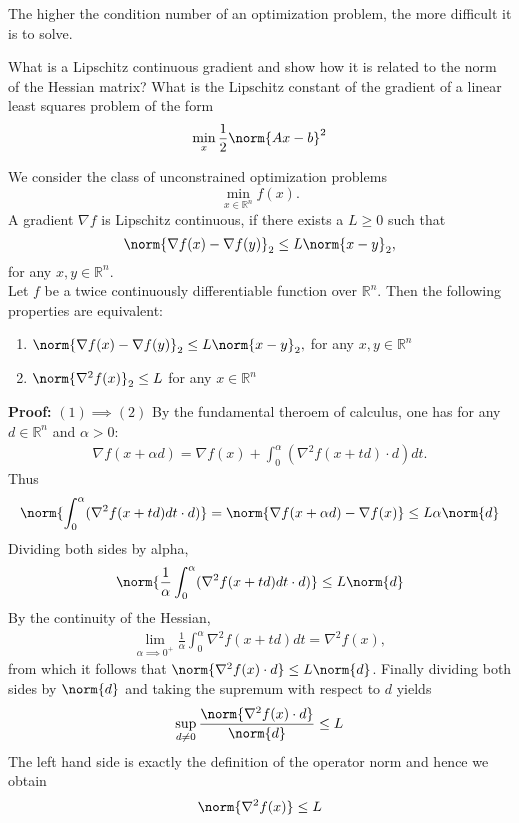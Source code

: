 \documentclass[12pt,a4paper]{article}
\begin{document}
 The higher the condition number of an optimization problem, the more difficult it is to solve.

\begin{question}
What is a Lipschitz continuous gradient and show how it is related to the norm of the Hessian matrix? What is the Lipschitz constant of the gradient of a linear least squares problem of the form
\begin{equation*}
     \min_x \frac{1}{2} \norm{Ax-b}^2
\end{equation*}
\end{question}
We consider the class of unconstrained optimization problems 
\begin{equation*}
\min_{x \in \mathbb{R}^n} f(x).
\end{equation*}
A gradient $\nabla f$ is Lipschitz continuous, if there exists a $L\geq 0$ such that
\begin{equation*}
     \norm{\nabla f(x) - \nabla f(y)}_2 \leq L\norm{x-y}_2,
\end{equation*}
for any $x,y\in\mathbb{R}^n$.\\
Let $f$ be a twice continuously differentiable function over $\mathbb{R}^n$. Then the following properties are equivalent:
\begin{enumerate}[(1)]
    \item $\norm{\nabla f(x) - \nabla f(y)}_2 \leq L\norm{x-y}_2,$ for any $x,y \in \mathbb{R}^n$
    \item $\norm{\nabla^2 f(x)}_2 \leq L$ for any $x \in \mathbb{R}^n$
\end{enumerate}
\textbf{Proof:} $(1) \implies (2)$ By the fundamental theroem of calculus, one has for any $d \in \mathbb{R}^n$ and $\alpha > 0$: 
\begin{align*}
     \nabla f(x + \alpha d)= \nabla f(x) + \int_{0}^{\alpha} (\nabla^2 f(x + td)\cdot d)dt.
\end{align*}
Thus
\begin{align*}
 \norm{\int_{0}^{\alpha} (\nabla^2 f(x + td)dt \cdot d)} = \norm{\nabla f(x + \alpha d) - \nabla f(x)} \leq L \alpha \norm{d}
\end{align*}
Dividing both sides by alpha,
\begin{align*}
 \norm{\frac{1}{\alpha}\int_{0}^{\alpha} (\nabla^2 f(x + td)dt \cdot d)}  \leq L  \norm{d}
\end{align*}
By the continuity of the Hessian,
\begin{align*}
 \lim_{\alpha \implies 0^+} \frac{1}{\alpha}\int_{0}^{\alpha} \nabla^2 f(x + td)dt = \nabla^2 f(x),
\end{align*}
from which it follows that $\norm{\nabla^2 f(x) \cdot d} \leq L\norm{d}$. Finally dividing both sides by $\norm{d}$ and taking the supremum with respect to $d$ yields
\begin{align*}
 \sup_{d \neq 0} \frac{\norm{\nabla^2 f(x) \cdot d}}{\norm{d}} \leq L
\end{align*}
The left hand side is exactly the definition of the operator norm and hence we obtain 
\begin{align*}
  \norm{\nabla^2 f(x)} \leq L
\end{align*}
\end{document}
